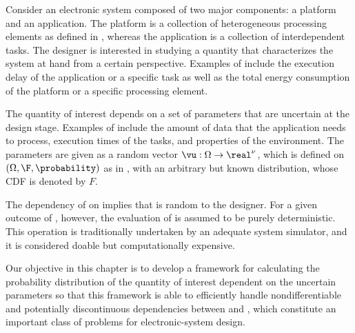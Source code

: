 Consider an electronic system composed of two major components: a platform and
an application. The platform is a collection of heterogeneous processing
elements as defined in , whereas the application is a
collection of interdependent tasks. The designer is interested in studying a
quantity \g that characterizes the system at hand from a certain perspective.
Examples of \g include the execution delay of the application or a specific task
as well as the total energy consumption of the platform or a specific processing
element.

The quantity of interest \g depends on a set of parameters \vu that are
uncertain at the design stage. Examples of \vu include the amount of data that
the application needs to process, execution times of the tasks, and properties
of the environment. The parameters \vu are given as a random vector $\vu: \Omega
\to \real^\nu$, which is defined on $(\Omega, \F, \probability)$ as in
, with an arbitrary but known distribution, whose
\ac{CDF} is denoted by $F$.

The dependency of \g on \vu implies that \g is random to the designer. For a
given outcome of \vu, however, the evaluation of \g is assumed to be purely
deterministic. This operation is traditionally undertaken by an adequate system
simulator, and it is considered doable but computationally expensive.

Our objective in this chapter is to develop a framework for calculating the
probability distribution of the quantity of interest \g dependent on the
uncertain parameters \vu so that this framework is able to efficiently handle
nondifferentiable and potentially discontinuous dependencies between \g and \vu,
which constitute an important class of problems for electronic-system design.
